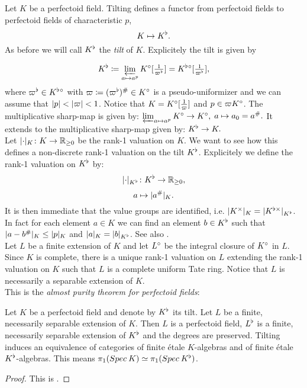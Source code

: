 Let $K$ be a perfectoid field.
Tilting defines a functor from perfectoid fields to perfectoid fields of characteristic $p$,
\[K\mapsto K^{\flat}.\]
As before we will call $K^{\flat}$ the \textit{tilt} of $K$. Explicitely the tilt is given by

\[K^{\flat}\coloneqq \varprojlim_{a\mapsto a^p}K{^{\circ}}[\tfrac{1}{\varpi^{\flat}}] = K^{\flat}{^{\circ}}[\tfrac{1}{\varpi^{\flat}}],\]
where $\varpi^{\flat}\in K^{\flat}{^{\circ}}$ with $\varpi\coloneqq(\varpi^{\flat})^{\#}\in K{^{\circ}}$ is a pseudo-uniformizer and we can assume that 
$\lvert p\rvert<\lvert\varpi\rvert<1$. Notice that $K=K{^{\circ}}[\tfrac{1}{\varpi}]$ and $p\in\varpi K{^{\circ}}$.
The multiplicative sharp-map is given by:
$\varprojlim_{a\mapsto a^p}K{^{\circ}}\to K{^{\circ}},$
$a\mapsto a_0=a^{\#}.$
It extends to the multiplicative sharp-map given by:
$K^{\flat}\to K.$\\


Let $\lvert\cdot\rvert_{K}\colon K\to\mathbb{R}_{\geq0}$ be the rank-1 valuation on $K$. We want to see how this defines a non-discrete rank-1 valuation on the tilt $K^{\flat}$. Explicitely we define the rank-1 valuation on $K^{\flat}$ by:
\[\lvert\cdot\rvert_{K^{\flat}}\colon K^{\flat}\to\mathbb{R}_{\geq0},\]
\[a\mapsto\lvert a^{\#}\rvert_{K}.\]
It is then immediate that the value groups are identified, i.e. $\lvert K^\times\rvert_{K}=\lvert K^{\flat\times}\rvert_{K^{\flat}}$. 
In fact for each element $a\in K$ we can find an element $b\in K^{\flat}$ such that $\lvert a-b^{\#}\rvert_{K}\leq \lvert p\rvert_{K}$ and $\lvert a\rvert_{K}=\lvert b\rvert_{K^{\flat}}$. See also \cite[proposition 3.6]{Scholze12}.\\


Let $L$ be a finite extension of $K$ and let $L{^{\circ}}$ be the integral closure of $K{^{\circ}}$ in $L$.
Since $K$ is complete, there is a unique rank-1 valuation on $L$ extending the rank-1 valuation on $K$
such that $L$ is a complete uniform Tate ring. Notice that $L$ is necessarily a separable extension of $K$.\\


This is the \emph{almost purity theorem for perfectoid fields}:

\begin{theorem}
Let $K$ be a perfectoid field and denote by $K^{\flat}$ its tilt. Let $L$ be a finite, necessarily separable extension of $K$.
Then $L$ is a perfectoid field, $L^{\flat}$ is a finite, necessarily separable extension of $K^{\flat}$ and the degrees are preserved.
Tilting induces an equivalence of categories of finite \'{e}tale $K$-algebras and of finite \'{e}tale $K^{\flat}$-algebras. 
This means $\pi_1({Spec{\:K}})\simeq\pi_1({Spec{\:K^{\flat}}})$.
\end{theorem}
\begin{proof}
This is \cite[theorem 3.7]{Scholze12}.
\end{proof}



